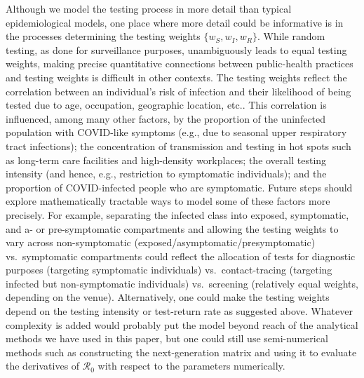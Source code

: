 \documentclass[smallextended]{svjour3}       %
\newcommand{\Rnum}{\ensuremath{\mathcal{R}_0}\xspace}
\DeclareRobustCommand\_{\ifmmode\expandafter\subtxt\else\textunderscore\fi}
\begin{document}
Although we model the testing process in more detail than typical epidemiological models, one place where more detail could be informative is in the processes determining the testing weights $\{w_S, w_I, w_R\}$. While random testing, as done for surveillance purposes, unambiguously leads to equal testing weights, making precise quantitative connections between public-health practices and testing weights is difficult in other contexts. The testing weights reflect the correlation between an individual's risk of infection and their likelihood of being tested due to age, occupation, geographic location, etc.. This correlation is influenced, among many other factors, by the proportion of the uninfected population with COVID-like symptoms (e.g., due to seasonal upper respiratory tract infections); the concentration of transmission and testing in hot spots such as long-term care facilities and high-density workplaces; the overall testing intensity (and hence, e.g., restriction to symptomatic individuals); and the proportion of COVID-infected people who are symptomatic. Future steps should explore mathematically tractable ways to model some of these factors more precisely. For example, separating the infected class into exposed, symptomatic, and a- or pre-symptomatic compartments and allowing the testing weights to vary across non-symptomatic (exposed/asymptomatic/presymptomatic) vs.\ symptomatic compartments could reflect the allocation of tests for diagnostic purposes (targeting symptomatic individuals) vs.\ contact-tracing (targeting infected but non-symptomatic individuals) vs.\ screening (relatively equal weights, depending on the venue). Alternatively, one could make the testing weights depend on the testing intensity or test-return rate as suggested above. Whatever complexity is added would probably put the model beyond reach of the analytical methods we have used in this paper, but one could still use semi-numerical methods such as constructing the next-generation matrix and using it to evaluate the derivatives of $\Rnum$ with respect to the parameters numerically.
\end{document}

